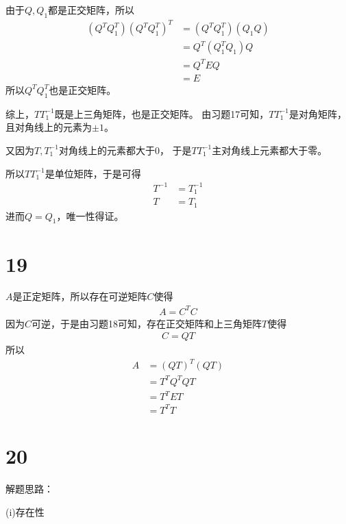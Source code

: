 \documentclass{article}
\begin{document}
由于$Q, Q_1$都是正交矩阵，所以
\begin{align*}
  (Q^T Q_1^T)(Q^T Q_1^T)^T
   & = (Q^T Q_1^T)(Q_1 Q) \\
   & = Q^T (Q_1^TQ_1) Q   \\
   & = Q^T E Q            \\
   & = E
\end{align*}
所以$Q^T Q_1^T$也是正交矩阵。

综上，$T T_1^{-1}$既是上三角矩阵，也是正交矩阵。
由习题17可知，$T T_1^{-1}$是对角矩阵，且对角线上的元素为$\pm 1$。

又因为$T, T_1^{-1}$对角线上的元素都大于$0$，
于是$T T_1^{-1}$主对角线上元素都大于零。

所以$T T_1^{-1}$是单位矩阵，于是可得
\begin{align*}
  T^{-1} & = T_1^{-1} \\
  T      & = T_1
\end{align*}
进而$Q = Q_1$，唯一性得证。

\section*{19}

$A$是正定矩阵，所以存在可逆矩阵$C$使得
\begin{align*}
  A = C^T C
\end{align*}
因为$C$可逆，于是由习题18可知，存在正交矩阵和上三角矩阵$T$使得
\begin{align*}
  C = Q T
\end{align*}
所以
\begin{align*}
  A & = (QT)^T (QT) \\
    & = T^T Q^T Q T \\
    & = T^T E T     \\
    & = T^T T
\end{align*}

\section*{20}

解题思路：

(i)存在性
\end{document}
